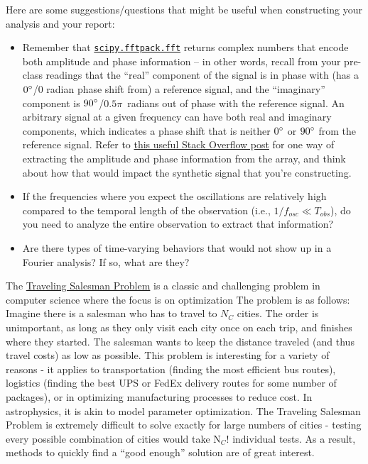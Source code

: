 \documentclass[10pt]{article}
\begin{document}
Here are some suggestions/questions that might be useful when
constructing your analysis and your report:

\begin{itemize}
  
  \item Remember that
    \href{https://docs.scipy.org/doc/scipy/reference/generated/scipy.fftpack.fft.html}{\texttt{scipy.fftpack.fft}}
    returns complex numbers that encode both amplitude and phase
    information -- in other words, recall from your pre-class readings that the ``real'' component
    of the signal is in phase with (has a $0\degree$/$0$ radian phase shift from)
    a reference signal, and the ``imaginary'' component is $90\degree$/$0.5\pi$~radians
    out of phase with the reference signal.  An arbitrary signal at
    a given frequency can have both real and imaginary components, which indicates a
    phase shift that is neither $0\degree$ or $90\degree$ from the
    reference signal.
    Refer to
    \href{https://dsp.stackexchange.com/questions/72005/calculate-the-magnitude-and-phase-of-a-signal-at-a-particular-frequency-in-pytho}{this
      useful Stack Overflow post} for one way of extracting the
    amplitude and phase information from the array, and think about
    how that would impact the synthetic signal that you're
    constructing.
  \item  If the frequencies where you expect the oscillations are
    relatively high compared to the temporal length of the observation
    (i.e., $1/f_{osc} \ll T_{obs}$), do you need to analyze the entire
    observation to extract that information?
  \item Are there types of time-varying behaviors that would not show
    up in a Fourier analysis?  If so, what are they?

\end{itemize}




\newpage
{}   
The
\href{https://simple.wikipedia.org/wiki/Travelling\_salesman\_problem}{Traveling
Salesman Problem} is a classic and challenging problem in computer science where the
focus is on optimization 
The problem is as follows: Imagine there is
a salesman who has to travel to $N_C$ cities.  The order is
unimportant, as long as they only visit each city once on each trip,
and finishes where they started.  The salesman wants to keep the
distance traveled (and thus travel costs) as low as possible.  This
problem is interesting for a variety of reasons - it applies to
transportation (finding the most efficient bus routes), logistics
(finding the best UPS or FedEx delivery routes for some number of
packages), or in optimizing manufacturing processes to reduce cost.
In astrophysics, it is akin to model parameter optimization.  The
Traveling Salesman Problem is extremely difficult to solve exactly for large
numbers of cities - testing every possible combination of cities would
take N$_C$! individual tests.  As a result, methods to quickly find a
``good enough'' solution are of great interest.
\end{document}
